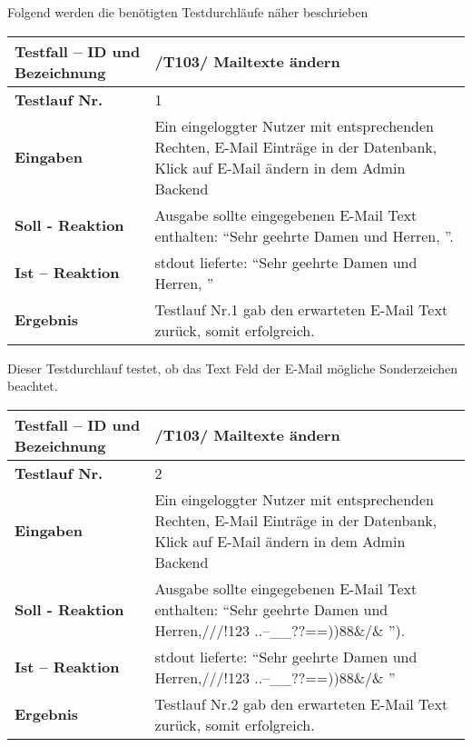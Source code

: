 Folgend werden die benötigten Testdurchläufe näher beschrieben
\begin{longtable}{|p{5cm}|p{10cm}|}
\hline
\textbf{Testfall -- ID und Bezeichnung} & \textnormal{/T103/ Mailtexte ändern} \\
\hline
\textbf{Testlauf Nr.} & \textnormal{1} \\
\hline
\textbf{Eingaben} & \textnormal{Ein eingeloggter Nutzer mit entsprechenden Rechten, E-Mail 
Einträge in der Datenbank, Klick auf E-Mail ändern in dem Admin Backend } \\
\hline
\textbf{Soll - Reaktion} & \textnormal{Ausgabe sollte eingegebenen E-Mail
Text enthalten: "`Sehr geehrte Damen und Herren, "'.
} \\
\hline
\textbf{Ist -- Reaktion} & \textnormal{stdout lieferte: "`Sehr geehrte Damen und Herren, "'} \\
\hline
\textbf{Ergebnis} & \textnormal{Testlauf Nr.1 gab den erwarteten E-Mail Text zurück, somit erfolgreich.} \\
\hline
 \end{longtable}
 
Dieser Testdurchlauf testet, ob das Text Feld der E-Mail mögliche Sonderzeichen beachtet.
\begin{longtable}{|p{5cm}|p{10cm}|}
\hline
\textbf{Testfall -- ID und Bezeichnung} & \textnormal{/T103/ Mailtexte ändern} \\
\hline
\textbf{Testlauf Nr.} & \textnormal{2} \\
\hline
\textbf{Eingaben} & \textnormal{Ein eingeloggter Nutzer mit entsprechenden Rechten, E-Mail 
Einträge in der Datenbank, Klick auf E-Mail ändern in dem Admin Backend } \\
\hline
\textbf{Soll - Reaktion} & \textnormal{Ausgabe sollte eingegebenen E-Mail
Text enthalten: "`Sehr geehrte Damen und Herren,///!123 
                    ..--\_\_??==))88\&/\& "').
} \\
\hline
\textbf{Ist -- Reaktion} & \textnormal{stdout lieferte: "`Sehr geehrte Damen und Herren,///!123 
                    ..--\_\_??==))88\&/\& "'} \\
\hline
\textbf{Ergebnis} & \textnormal{Testlauf Nr.2 gab den erwarteten E-Mail Text zurück, somit erfolgreich.} \\
\hline
 \end{longtable} 
 

